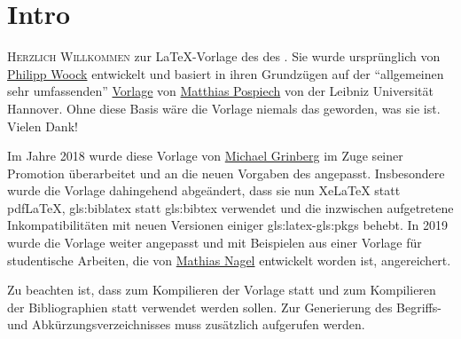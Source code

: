 \chapter*{Intro}
%
%
%
%
%
\lettrine[nindent=0.2em]{H}{erzlich Willkommen} zur \LaTeX-Vorlage
des  %
des . %
Sie wurde ursprünglich von
\href{http://ies.anthropomatik.kit.edu/mitarbeiter.php?person=woock}{Philipp Woock}
entwickelt und basiert in ihren Grundzügen auf der \enquote{allgemeinen sehr umfassenden}
\href{http://www.matthiaspospiech.de/latex/templates/thesis/}{Vorlage} von 
\href{http://www.matthiaspospiech.de}{Matthias Pospiech} von der Leibniz Universität Hannover.
Ohne diese Basis wäre die Vorlage niemals das geworden, was sie ist. Vielen Dank!

Im Jahre 2018 wurde diese Vorlage von
\href{http://ies.anthropomatik.kit.edu/mitarbeiter.php?person=grinberg}{Michael Grinberg}
im Zuge seiner Promotion überarbeitet und an die neuen Vorgaben des  angepasst.
Insbesondere wurde die Vorlage dahingehend abgeändert, dass sie nun XeLaTeX statt pdfLaTeX, 
\gls{gls:biblatex} statt \gls{gls:bibtex} verwendet und die inzwischen aufgetretene
Inkompatibilitäten mit neuen Versionen einiger \gls{gls:latex}-\glspl{gls:pkg} behebt.
In 2019 wurde die Vorlage weiter angepasst und mit Beispielen aus einer Vorlage
für studentische Arbeiten, die von
\href{https://crypto.iti.kit.edu/index.php?id=nagel}{Mathias Nagel}
entwickelt worden ist, angereichert.

Zu beachten ist, dass zum Kompilieren der Vorlage
 statt 
und zum Kompilieren der Bibliographien
 statt 
verwendet werden sollen.
Zur Generierung des Begriffs- und Abkürzungsverzeichnisses muss zusätzlich
 aufgerufen werden.